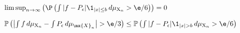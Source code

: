 

        



\begin{lemma}
    \label{lem:first_term_of_first_term_zero}
    \uses{} %
    \notready
    $  \limsup_{n\to\infty} \left(\P\left(\int |f-P_\epsilon|\1_{|x|\le b}\,d\mu_{\mathrm{X}_n}>\e/6\right) \right) = 0$
\end{lemma}


\begin{lemma}
    \label{lem:first_term_estimate}
    \notready
    $\mathbb{P}\left(\left|\int f\,d\mu_{\mathrm{X}_n} - \int P_\epsilon\,d\mu_{\mx{X}_n}\right|>\e/3\right) \le \mathbb{P}\left(\int |f-P_\epsilon|\1_{|x|> b}\,d\mu_{\mathrm{X}_n}>\e/6\right)$
\end{lemma}

